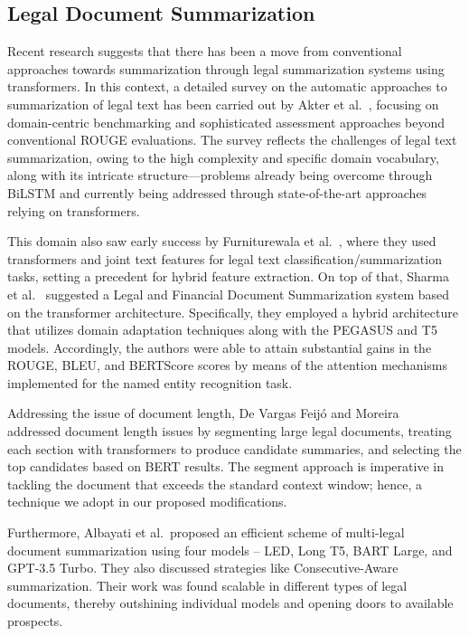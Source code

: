 \documentclass[preprint,12pt]{elsarticle}
\begin{document}
\subsection{Legal Document Summarization}
Recent research suggests that there has been a move from conventional approaches towards summarization through legal summarization systems using transformers. In this context, a detailed survey on the automatic approaches to summarization of legal text has been carried out by Akter et al.~\cite{akter2025legal}, focusing on domain-centric benchmarking and sophisticated assessment approaches beyond conventional ROUGE evaluations. The survey reflects the challenges of legal text summarization, owing to the high complexity and specific domain vocabulary, along with its intricate structure—problems already being overcome through BiLSTM and currently being addressed through state-of-the-art approaches relying on transformers.

This domain also saw early success by Furniturewala et al.~\cite{furniturewala2021legal}, where they used transformers and joint text features for legal text classification/summarization tasks, setting a precedent for hybrid feature extraction.
On top of that, Sharma et al.~\cite{sharma2024legal} suggested a Legal and Financial Document Summarization system based on the transformer architecture. Specifically, they employed a hybrid architecture that utilizes domain adaptation techniques along with the PEGASUS and T5 models. Accordingly, the authors were able to attain substantial gains in the ROUGE, BLEU, and BERTScore scores by means of the attention mechanisms implemented for the named entity recognition task.

Addressing the issue of document length, De Vargas Feijó and Moreira~\cite{vargas2023legal} addressed document length issues by segmenting large legal documents, treating each section with transformers to produce candidate summaries, and selecting the top candidates based on BERT results. The segment approach is imperative in tackling the document that exceeds the standard context window; hence, a technique we adopt in our proposed modifications.

Furthermore, Albayati et al.~\cite{albayati2025multi}proposed an efficient scheme of multi-legal document summarization using four models – LED, Long T5, BART Large, and GPT-3.5 Turbo. They also discussed strategies like Consecutive-Aware summarization. Their work was found scalable in different types of legal documents, thereby outshining individual models and opening doors to available prospects.
\end{document}
